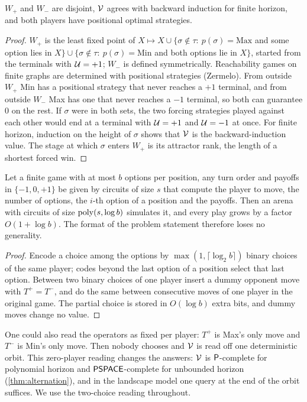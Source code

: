 \begin{lemma}\label{lem:well-defined}
$W_{+}$ and $W_{-}$ are disjoint, $\mathcal{V}$ agrees with backward induction for finite horizon, and both players have positional optimal strategies.
\end{lemma}

\begin{proof}
$W_{+}$ is the least fixed point of $X\mapsto X\cup\{\sigma\notin\tau:\ p(\sigma)=\mathrm{Max}$ and some option lies in $X\}\cup\{\sigma\notin\tau:\ p(\sigma)=\mathrm{Min}$ and both options lie in $X\}$, started from the terminals with $\mathcal{U}=+1$; $W_{-}$ is defined symmetrically. Reachability games on finite graphs are determined with positional strategies (Zermelo). From outside $W_{+}$ Min has a positional strategy that never reaches a $+1$ terminal, and from outside $W_{-}$ Max has one that never reaches a $-1$ terminal, so both can guarantee $0$ on the rest. If $\sigma$ were in both sets, the two forcing strategies played against each other would end at a terminal with $\mathcal{U}=+1$ and $\mathcal{U}=-1$ at once. For finite horizon, induction on the height of $\sigma$ shows that $\mathcal{V}$ is the backward-induction value. The stage at which $\sigma$ enters $W_{+}$ is its attractor rank, the length of a shortest forced win.
\end{proof}

\begin{lemma}\label{lem:normal-form}
Let a finite game with at most $b$ options per position, any turn order and payoffs in $\{-1,0,+1\}$ be given by circuits of size $s$ that compute the player to move, the number of options, the $i$-th option of a position and the payoffs. Then an arena with circuits of size $\operatorname{poly}(s,\log b)$ simulates it, and every play grows by a factor $O(1+\log b)$. The format of the problem statement therefore loses no generality.
\end{lemma}

\begin{proof}
Encode a choice among the options by $\max(1,\lceil\log_2 b\rceil)$ binary choices of the same player; codes beyond the last option of a position select that last option. Between two binary choices of one player insert a dummy opponent move with $T^{+}=T^{-}$, and do the same between consecutive moves of one player in the original game. The partial choice is stored in $O(\log b)$ extra bits, and dummy moves change no value.
\end{proof}

One could also read the operators as fixed per player: $T^{+}$ is Max's only move and $T^{-}$ is Min's only move. Then nobody chooses and $\mathcal{V}$ is read off one deterministic orbit. This zero-player reading changes the answers: $\mathcal{V}$ is $\mathsf{P}$-complete for polynomial horizon and $\mathsf{PSPACE}$-complete for unbounded horizon (\cref{thm:alternation}), and in the landscape model one query at the end of the orbit suffices. We use the two-choice reading throughout.


